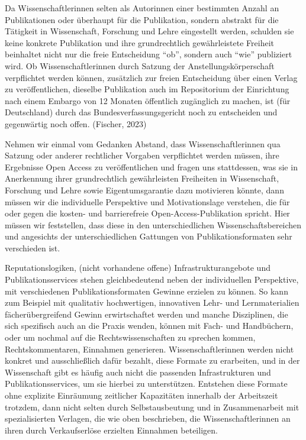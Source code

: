\documentclass[a4paper,
fontsize=11pt,
oneside,
numbers=noperiodatend,
parskip=half-,
bibliography=totoc,
final
]{scrartcl}
\begin{document}
Da Wissenschaftlerinnen selten als Autorinnen einer bestimmten Anzahl an
Publikationen oder überhaupt für die Publikation, sondern abstrakt für
die Tätigkeit in Wissenschaft, Forschung und Lehre eingestellt werden,
schulden sie keine konkrete Publikation und ihre grundrechtlich
gewährleistete Freiheit beinhaltet nicht nur die freie Entscheidung
\enquote{ob}, sondern auch \enquote{wie} publiziert wird. Ob
Wissenschaftlerinnen durch Satzung der Anstellungskörperschaft
verpflichtet werden können, zusätzlich zur freien Entscheidung über
einen Verlag zu veröffentlichen, dieselbe Publikation auch im
Repositorium der Einrichtung nach einem Embargo von 12 Monaten
öffentlich zugänglich zu machen, ist (für Deutschland) durch das
Bundesverfassungsgericht noch zu entscheiden und gegenwärtig noch offen.
(Fischer, 2023)

Nehmen wir einmal vom Gedanken Abstand, dass Wissenschaftlerinnen qua
Satzung oder anderer rechtlicher Vorgaben verpflichtet werden müssen,
ihre Ergebnisse Open Access zu veröffentlichen und fragen uns
stattdessen, was sie in Anerkennung ihrer grundrechtlich gewährleisten
Freiheiten in Wissenschaft, Forschung und Lehre sowie Eigentumsgarantie
dazu motivieren könnte, dann müssen wir die individuelle Perspektive und
Motivationslage verstehen, die für oder gegen die kosten- und
barrierefreie Open-Access-Publikation spricht. Hier müssen wir
feststellen, dass diese in den unterschiedlichen Wissenschaftsbereichen
und angesichts der unterschiedlichen Gattungen von Publikationsformaten
sehr verschieden ist.

Reputationslogiken, (nicht vorhandene offene) Infrastrukturangebote und
Publikationsservices stehen gleichbedeutend neben der individuellen
Perspektive, mit verschiedenen Publikationsformaten Gewinne erzielen zu
können. So kann zum Beispiel mit qualitativ hochwertigen, innovativen
Lehr- und Lernmaterialien fächerübergreifend Gewinn erwirtschaftet
werden und manche Disziplinen, die sich spezifisch auch an die Praxis
wenden, können mit Fach- und Handbüchern, oder um nochmal auf die
Rechtswissenschaften zu sprechen kommen, Rechtskommentaren, Einnahmen
generieren. Wissenschaftlerinnen werden nicht konkret und ausschließlich
dafür bezahlt, diese Formate zu erarbeiten, und in der Wissenschaft gibt
es häufig auch nicht die passenden Infrastrukturen und
Publikationsservices, um sie hierbei zu unterstützen. Entstehen diese
Formate ohne explizite Einräumung zeitlicher Kapazitäten innerhalb der
Arbeitszeit trotzdem, dann nicht selten durch Selbstausbeutung und in
Zusammenarbeit mit spezialisierten Verlagen, die wie oben beschrieben,
die Wissenschaftlerinnen an ihren durch Verkaufserlöse erzielten
Einnahmen beteiligen.
\end{document}
